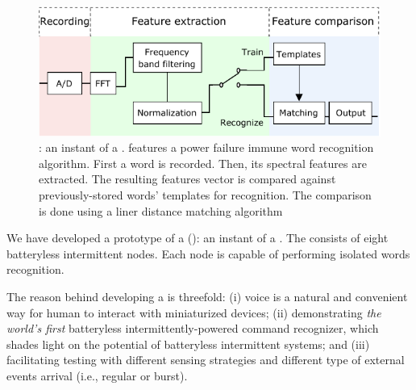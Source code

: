 \begin{figure}
	\centering
	\includegraphics[width=\columnwidth]{figures/cis}
	\caption{\fullCIM: an instant of a \fullsys. \cim features a power failure immune word recognition algorithm. First a word is recorded. Then, its spectral features are extracted. The resulting features vector is compared against previously-stored words' templates for recognition. The comparison is done using a liner distance matching algorithm}
	\label{fig:cis}
\end{figure}

We have developed a prototype of a \fullcim (\cim): an instant of a \fullsys. The \cim consists of eight batteryless intermittent nodes. Each node is capable of performing isolated words recognition. 

The reason behind developing a \cim is threefold: (i) voice is a natural and convenient way for human to interact with miniaturized devices; (ii) demonstrating \textit{the world's first} batteryless intermittently-powered command recognizer, which shades light on the potential of batteryless intermittent systems; and (iii) facilitating testing with different sensing strategies and different type of external events arrival (i.e., regular  or burst). 



